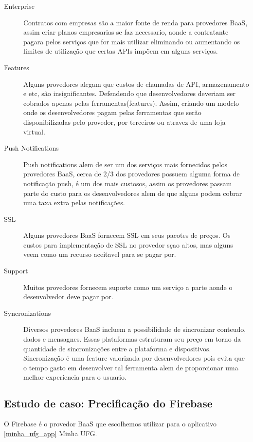 \begin{description}
		\item[Enterprise] { Contratos com empresas são a maior fonte de renda para provedores BaaS, assim criar planos empresarias se faz necessario, aonde a contratante pagara pelos serviços que for mais utilizar eliminando ou aumentando os limites de utilização que certas APIs impõem em alguns serviços.}
		
		\item[Features] { Alguns provedores alegam que custos de chamadas de API, armazenamento e etc, são insignificantes. Defendendo que desenvolvedores deveriam ser cobrados apenas pelas ferramentas(features). Assim, criando um modelo onde os desenvolvedores pagam pelas ferramentas que serão disponibilizadas pelo provedor, por terceiros ou atravez de uma loja virtual.}
		
		\item[Push Notifications] { Push notifications alem de ser um dos serviços mais fornecidos pelos provedores BaaS, cerca de 2/3 dos provedores possuem alguma forma de notificação push, é um dos mais custosos, assim os provedores passam parte do custo para os desenvolvedores alem de que alguns podem cobrar uma taxa extra pelas notificações.}
		
		\item[SSL] { Alguns provedores BaaS fornecem SSL em seus pacotes de preços. Os custos para implementação de SSL no provedor sçao altos, mas alguns veem como um recurso aceitavel para se pagar por. }
		
		\item[Support] { Muitos provedores fornecem suporte como um serviço a parte aonde o desenvolvedor deve pagar por. }
		
		\item[Syncronizations] { Diversos provedores BaaS incluem a possibilidade de sincronizar conteudo, dados e mensagnes. Essas plataformas estruturam seu preço em torno da quantidade de sincronizações entre a plataforma e dispositivos. Sincronização é uma feature valorizada por desenvolvedores pois evita que o tempo gasto em desenvolver tal ferramenta alem de proporcionar uma melhor experiencia para o usuario. }
	\end{description}

	\subsection{Estudo de caso: Precificação do Firebase}
	O Firebase é o provedor BaaS que escolhemos utilizar para o aplicativo \ref{minha_ufg_app} Minha UFG.


